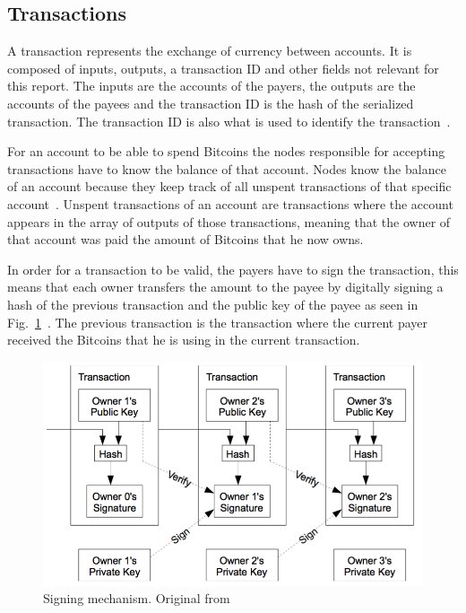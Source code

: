 \subsection{Transactions}
\label{sec:transactions}

A  transaction represents the exchange of currency between accounts. It is composed of inputs, outputs, a transaction ID and other fields not relevant for this report. The inputs are the accounts of the payers, the outputs are the accounts of the payees and the transaction ID is the hash of the serialized transaction. The transaction ID is also what is used to identify the transaction~\cite{decker2013information}.

For an account to be able to spend Bitcoins the nodes responsible for accepting transactions have to know the balance of that account. Nodes know the balance of an account because they keep track of all unspent transactions of that specific account~\cite{decker2013information}. Unspent transactions of an account are transactions where the account appears in the array of outputs of those transactions, meaning that the owner of that account was paid the amount of Bitcoins that he now owns.

In order for a transaction to be valid, the payers have to sign the transaction, this means that each owner transfers the amount to the payee by digitally signing a hash of the previous transaction and the public key of the payee as seen in Fig.~\ref{fig:signature}~\cite{nakamoto2008bitcoin}. The previous transaction is the transaction where the current payer received the Bitcoins that he is using in the current transaction.

\begin{figure}[h]
\centering
\includegraphics[scale=0.5]{figs/transactions}
\caption{Signing mechanism. Original from~\protect\cite{nakamoto2008bitcoin}}
\label{fig:signature}
\end{figure}

